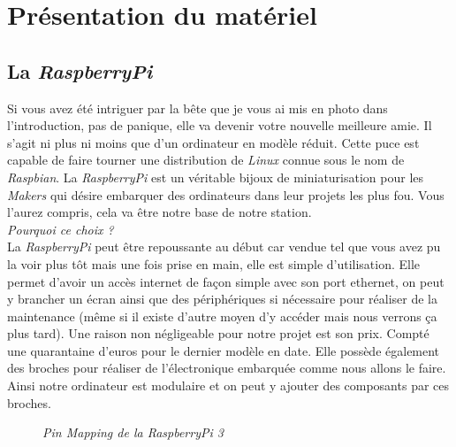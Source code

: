 \chapter{Présentation du matériel}

\section{La \textit{RaspberryPi}}

Si vous avez été intriguer par la bête que je vous ai mis en photo dans l'introduction, pas de panique, elle va devenir votre nouvelle meilleure amie. Il s'agit ni plus ni moins que d'un ordinateur en modèle réduit.
Cette puce est capable de faire tourner une distribution de \textit{Linux} connue sous le nom de \textit{Raspbian}. La \textit{RaspberryPi} est un véritable bijoux de miniaturisation pour les \textit{Makers} qui désire embarquer des ordinateurs dans leur projets les plus fou. Vous l'aurez compris, cela va être notre base de notre station.\\

\textit{Pourquoi ce choix ? }\\

La \textit{RaspberryPi} peut être repoussante au début car vendue tel que vous avez pu la voir  plus tôt mais une fois prise en main, elle est simple d'utilisation. Elle permet d'avoir un accès internet de façon simple avec son port ethernet, on peut y brancher un écran ainsi que des périphériques si nécessaire pour réaliser de la maintenance (même si il existe d'autre moyen d'y accéder mais nous verrons ça plus tard). 
Une raison non négligeable pour notre projet est son prix. Compté une quarantaine d'euros pour le dernier modèle en date.
Elle possède également des broches pour réaliser de l'électronique embarquée comme nous allons le faire. Ainsi notre ordinateur est modulaire et on peut y ajouter des composants par ces broches.\\

\begin{figure}[H]
\begin{center}
\end{center}
	\caption{ \textit{Pin Mapping de la RaspberryPi 3}}
\end{figure}\\

